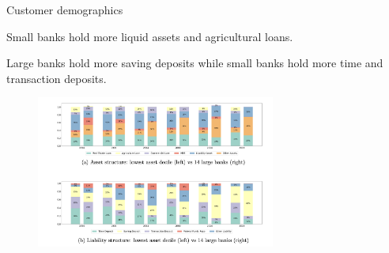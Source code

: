\documentclass[notes,10pt, aspectratio=169]{beamer}
\newenvironment{wideitemize}{\itemize\addtolength{\itemsep}{10pt}}{\enditemize}
\begin{document}
    \begin{frame}{Customer demographics}

        
            \begin{wideitemize}
        
                \item Small banks hold more liquid assets and agricultural loans.
                \item Large banks hold more saving deposits while small banks hold more time and transaction deposits.
        \end{wideitemize}
        
        \begin{figure}
        \centering
        \includegraphics[width=0.7\textwidth]{imgs/fig7.png}
        \end{figure}
        
        \end{frame}
    
    



\end{document}

